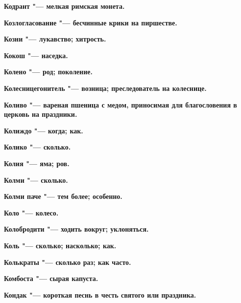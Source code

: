 \begin{mymulticols}{2}
\bfseries Кодрант\normalfont{} "--- мелкая римская монета. 




\bfseries Козлогласование\normalfont{} "--- бесчинные крики на пиршестве. 




\bfseries Козни\normalfont{} "--- лукавство; хитрость. 




\bfseries Кокош\normalfont{} "--- наседка. 




\bfseries Колено\normalfont{} "--- род; поколение. 




\bfseries Колесницегонитель\normalfont{} "--- возница; преследователь на колеснице. 




\bfseries Коливо\normalfont{} "--- вареная пшеница с медом, приносимая для благословения в церковь на праздники. 




\bfseries Колиждо\normalfont{} "--- когда; как. 




\bfseries Колико\normalfont{} "--- сколько. 




\bfseries Колия\normalfont{} "--- яма; ров. 




\bfseries Колми\normalfont{} "--- сколько. 




\bfseries Колми паче\normalfont{} "--- тем более; особенно. 




\bfseries Коло\normalfont{} "--- колесо. 




\bfseries Колобродити\normalfont{} "--- ходить вокруг; уклоняться. 




\bfseries Коль\normalfont{} "--- сколько; насколько; как. 




\bfseries Колькраты\normalfont{} "--- сколько раз; как часто. 




\bfseries Комбоста\normalfont{} "--- сырая капуста. 




\bfseries Кондак\normalfont{} "--- короткая песнь в честь святого или праздника. 





\end{mymulticols}
